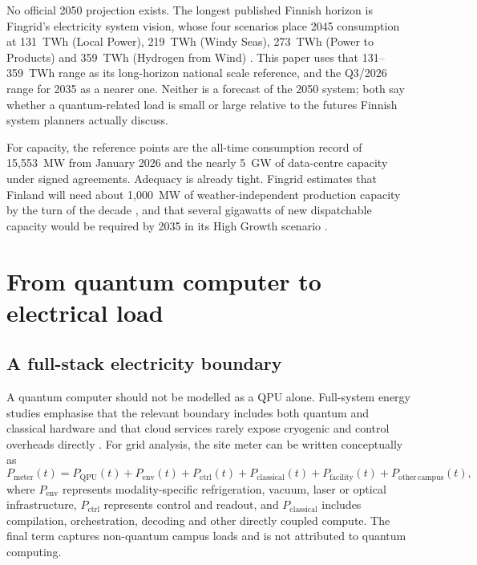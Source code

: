 \documentclass[11pt,a4paper]{article}
\begin{document}
No official 2050 projection exists. The longest published Finnish horizon is Fingrid's electricity system vision, whose four scenarios place 2045 consumption at 131~TWh (Local Power), 219~TWh (Windy Seas), 273~TWh (Power to Products) and 359~TWh (Hydrogen from Wind) \citep{fingrid2023vision}. This paper uses that 131--359~TWh range as its long-horizon national scale reference, and the Q3/2026 range for 2035 as a nearer one. Neither is a forecast of the 2050 system; both say whether a quantum-related load is small or large relative to the futures Finnish system planners actually discuss.

For capacity, the reference points are the all-time consumption record of 15,553~MW from January 2026 \citep{fingrid2026q1} and the nearly 5~GW of data-centre capacity under signed agreements. Adequacy is already tight. Fingrid estimates that Finland will need about 1,000~MW of weather-independent production capacity by the turn of the decade \citep{fingrid2026q3}, and that several gigawatts of new dispatchable capacity would be required by 2035 in its High Growth scenario \citep{fingrid2026prospects}.

\section{From quantum computer to electrical load}
\subsection{A full-stack electricity boundary}
A quantum computer should not be modelled as a QPU alone. Full-system energy studies emphasise that the relevant boundary includes both quantum and classical hardware and that cloud services rarely expose cryogenic and control overheads directly \citep{niu2026full,carrasco2026energy}. For grid analysis, the site meter can be written conceptually as
\begin{equation}\label{eq:meter}
P_{\mathrm{meter}}(t) = P_{\mathrm{QPU}}(t) + P_{\mathrm{env}}(t) + P_{\mathrm{ctrl}}(t) + P_{\mathrm{classical}}(t) + P_{\mathrm{facility}}(t) + P_{\mathrm{other\,campus}}(t),
\end{equation}
where $P_{\mathrm{env}}$ represents modality-specific refrigeration, vacuum, laser or optical infrastructure, $P_{\mathrm{ctrl}}$ represents control and readout, and $P_{\mathrm{classical}}$ includes compilation, orchestration, decoding and other directly coupled compute. The final term captures non-quantum campus loads and is not attributed to quantum computing.
\end{document}
